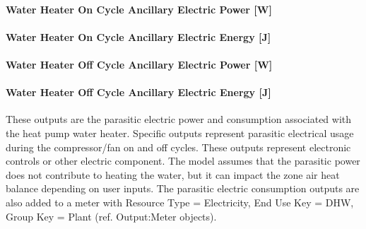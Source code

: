 \paragraph{Water Heater On Cycle Ancillary Electric Power {[}W{]}}\label{water-heater-on-cycle-ancillary-electric-power-w-1}

\paragraph{Water Heater On Cycle Ancillary Electric Energy {[}J{]}}\label{water-heater-on-cycle-ancillary-electric-energy-j-1}

\paragraph{Water Heater Off Cycle Ancillary Electric Power {[}W{]}}\label{water-heater-off-cycle-ancillary-electric-power-w-1}

\paragraph{Water Heater Off Cycle Ancillary Electric Energy {[}J{]}}\label{water-heater-off-cycle-ancillary-electric-energy-j-1}

These outputs are the parasitic electric power and consumption associated with the heat pump water heater. Specific outputs represent parasitic electrical usage during the compressor/fan on and off cycles. These outputs represent electronic controls or other electric component. The model assumes that the parasitic power does not contribute to heating the water, but it can impact the zone air heat balance depending on user inputs. The parasitic electric consumption outputs are also added to a meter with Resource Type = Electricity, End Use Key = DHW, Group Key = Plant (ref. Output:Meter objects).
